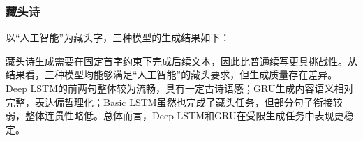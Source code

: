 \documentclass[12pt,a4paper]{article}
\begin{document}





\subsubsection{藏头诗}

以“人工智能”为藏头字，三种模型的生成结果如下：

\vspace{0.5em}
\noindent{}

\vspace{0.3em}
藏头诗生成需要在固定首字约束下完成后续文本，因此比普通续写更具挑战性。从结果看，三种模型均能够满足“人工智能”的藏头要求，但生成质量存在差异。Deep LSTM的前两句整体较为流畅，具有一定古诗语感；GRU生成内容语义相对完整，表达偏哲理化；Basic LSTM虽然也完成了藏头任务，但部分句子衔接较弱，整体连贯性略低。总体而言，Deep LSTM和GRU在受限生成任务中表现更稳定。
\end{document}
